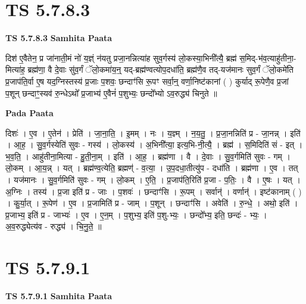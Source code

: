 \documentclass[17pt]{extarticle}
\begin{document}
\section{ TS 5.7.8.3 }

\textbf{TS 5.7.8.3 } \newline
\textbf{Samhita Paata} \newline

दिश॑ ए॒वैतेन॒ प्र जा॑नाती॒मं नो॑ य॒ज्ञ्ं न॑यतु प्रजा॒नन्नित्या॑ह सुव॒र्गस्य॑ लो॒कस्या॒भिनी᳚त्यै॒ ब्रह्म॑ स॒मिद्-भ॑व॒त्याहु॑तीना॒-मित्या॑ह॒ ब्रह्म॑णा॒ वै दे॒वाः सु॑व॒र्गं ॅलो॒कमा॑य॒न्॒ यद्-ब्रह्म॑ण्वत्योप॒दधा॑ति॒ ब्रह्म॑णै॒व तद्-यज॑मानः सुव॒र्गं ॅलो॒कमे॑ति प्र॒जाप॑ति॒र्वा ए॒ष यद॒ग्निस्तस्य॑ प्र॒जाः प॒शवः॒ छन्दाꣳ॑सि रू॒पꣳ सर्वा॒न्॒ वर्णा॒निष्ट॑कानां ( ) कुर्याद् रू॒पेणै॒व प्र॒जां प॒शून् छन्दाꣳ॒॒स्यव॑ रु॒न्धेऽथो᳚ प्र॒जाभ्य॑ ए॒वैनं॑ प॒शुभ्यः॒ छन्दो᳚भ्यो ऽव॒रुद्ध्य॑ चिनुते ॥ \newline

\textbf{Pada Paata} \newline

दिशः॑ । ए॒व । ए॒तेन॑ । प्रेति॑ । जा॒ना॒ति॒ । इ॒मम् । नः । य॒ज्ञ्म् । न॒य॒तु॒ । प्र॒जा॒नन्निति॑ प्र - जा॒नन्न् । इति॑ । आ॒ह॒ । सु॒व॒र्गस्येति॑ सुवः - गस्य॑ । लो॒कस्य॑ । अ॒भिनी᳚त्या॒ इत्य॒भि-नी॒त्यै॒ । ब्रह्म॑ । स॒मिदिति॑ सं - इत् । भ॒व॒ति॒ । आहु॑तीना॒मित्या - हु॒ती॒ना॒म् । इति॑ । आ॒ह॒ । ब्रह्म॑णा । वै । दे॒वाः । सु॒व॒र्गमिति॑ सुवः - गम् । लो॒कम् । आ॒य॒न्न् । यत् । ब्रह्म॑ण्व॒त्येति॒ ब्रह्मण्॑ - व॒त्या॒ । उ॒प॒दधा॒तीत्यु॑प - दधा॑ति । ब्रह्म॑णा । ए॒व । तत् । यज॑मानः । सु॒व॒र्गमिति॑ सुवः - गम् । लो॒कम् । ए॒ति॒ । प्र॒जाप॑ति॒रिति॑ प्र॒जा - प॒तिः॒ । वै । ए॒षः । यत् । अ॒ग्निः । तस्य॑ । प्र॒जा इति॑ प्र - जाः । प॒शवः॑ । छन्दाꣳ॑सि । रू॒पम् । सर्वान्॑ । वर्णान्॑ । इष्ट॑कानाम् ( ) । कु॒र्या॒त् । रू॒पेण॑ । ए॒व । प्र॒जामिति॑ प्र - जाम् । प॒शून् । छन्दाꣳ॑सि । अवेति॑ । रु॒न्धे॒ । अथो॒ इति॑ । प्र॒जाभ्य॒ इति॑ प्र - जाभ्यः॑ । ए॒व । ए॒न॒म् । प॒शुभ्य॒ इति॑ प॒शु-भ्यः॒ । छन्दो᳚भ्य॒ इति॒ छन्दः॑ - भ्यः॒ । अ॒व॒रुद्ध्येत्य॑व - रुद्ध्य॑ । चि॒नु॒ते॒ ॥  \newline





\section{ TS 5.7.9.1 }

\textbf{TS 5.7.9.1 } \newline
\textbf{Samhita Paata} \newline
\end{document}
